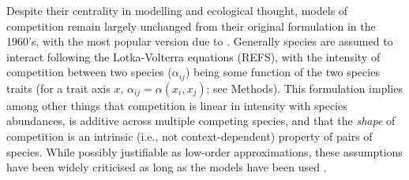 \documentclass[a4paper,11pt]{article}
\begin{document}
%
%
Despite their centrality in modelling and ecological thought, models
of competition remain largely unchanged from their original
formulation in the 1960's, with the most popular version due to
\citet{MacArthur-1967}.
Generally species are assumed to interact following the Lotka-Volterra
equations (REFS), with the intensity of competition between two
species ($\alpha_{ij}$) being some function of the two species traits
(for a trait axis $x$, $\alpha_{ij} = \alpha(x_i, x_j)$; see Methods).
%
This formulation implies among other things that competition is linear
in intensity with species abundances, is additive across multiple
competing species, and that the \emph{shape} of competition is an
intrinsic (i.e., not context-dependent) property of pairs of species.
%
While possibly justifiable as low-order approximations, these
assumptions have been widely criticised as long as the models have
been used
\citep[e.g.][]{Andrewartha-1953,May-1972,Abrams-1975}.
\end{document}
